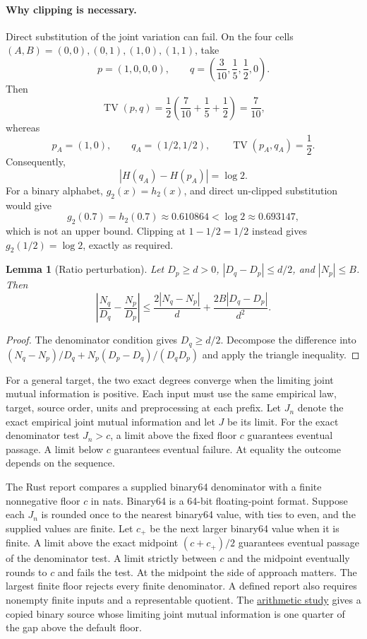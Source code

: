 \documentclass[11pt]{article}
\newtheorem{lemma}[theorem]{Lemma}
\theoremstyle{definition}
\begin{document}
\paragraph{Why clipping is necessary.}
Direct substitution of the joint variation can fail.  On the four cells
$(A,B)=(0,0),(0,1),(1,0),(1,1)$, take
\[
  p=(1,0,0,0),
  \qquad
  q=\left(\frac3{10},\frac15,\frac12,0\right).
\]
Then
\[
  \operatorname{TV}(p,q)
  =\frac12\left(\frac7{10}+\frac15+\frac12\right)
  =\frac7{10},
\]
whereas
\[
  p_A=(1,0),\qquad q_A=(1/2,1/2),\qquad
  \operatorname{TV}(p_A,q_A)=\frac12.
\]
Consequently,
\[
  |H(q_A)-H(p_A)|=\log2.
\]
For a binary alphabet, $g_2(x)=h_2(x)$, and direct un-clipped substitution would give
\[
  g_2(0.7)=h_2(0.7)\approx0.610864
  <\log2\approx0.693147,
\]
which is not an upper bound.  Clipping at $1-1/2=1/2$ instead gives
$g_2(1/2)=\log2$, exactly as required.

\begin{lemma}[Ratio perturbation]\label{lem:ratio}
Let $D_p\ge d>0$, $|D_q-D_p|\le d/2$, and $|N_p|\le B$.  Then
\begin{equation}
  \left|\frac{N_q}{D_q}-\frac{N_p}{D_p}\right|
  \le
  \frac{2|N_q-N_p|}{d}
  +\frac{2B|D_q-D_p|}{d^2}.
\end{equation}
\end{lemma}

\begin{proof}
The denominator condition gives $D_q\ge d/2$.  Decompose the difference into
$(N_q-N_p)/D_q+N_p(D_p-D_q)/(D_qD_p)$ and apply the triangle inequality.
\end{proof}

For a general target, the two exact degrees converge when the limiting joint mutual information
is positive. Each input must use the same empirical law, target, source order, units and
preprocessing at each prefix. Let $J_n$ denote the exact empirical joint mutual information and
let $J$ be its limit. For the exact denominator test $J_n>c$, a limit above the fixed floor $c$
guarantees eventual passage. A limit below $c$ guarantees eventual failure. At equality the
outcome depends on the sequence.

The Rust report compares a supplied binary64 denominator with a finite nonnegative floor $c$
in nats. Binary64 is a 64-bit floating-point format. Suppose each $J_n$ is rounded once to
the nearest binary64 value, with ties to even, and the supplied values are finite. Let $c_+$
be the next larger binary64 value when it is finite. A limit above the exact midpoint
$(c+c_+)/2$ guarantees eventual passage of the denominator test. A limit strictly between $c$
and the midpoint eventually rounds to $c$ and fails the test. At the midpoint the side of
approach matters. The largest finite floor rejects every finite denominator. A defined report
also requires nonempty finite inputs and a representable quotient. The
\href{https://github.com/sepahead/pid-rs/blob/main/audit/research/normalized-shannon-arithmetic/README.md}{arithmetic study}
gives a copied binary source whose limiting joint mutual information is one quarter of the gap
above the default floor.
\end{document}
